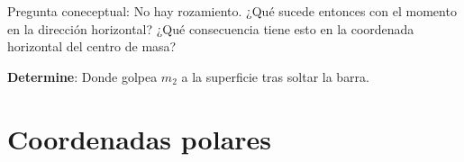 \documentclass[11pt, spanish, a4paper, twoside]{article}
\begin{document}
\begin{enumerate}
Pregunta coneceptual:
No hay rozamiento. ¿Qué sucede entonces con el momento en la dirección horizontal?
¿Qué consecuencia tiene esto en la coordenada horizontal del centro de masa?

\textbf{Determine}:
Donde golpea \(m_2\) a la superficie tras soltar la barra.






\section*{Coordenadas polares}


\end{enumerate}
\end{document}
